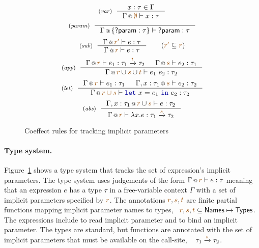 \begin{figure}[t]
\begin{equation*}
\tyrule{var}
  {x : \tau \in \Gamma}
  {\coctx{\Gamma}{\aclrd{\emptyset}} \vdash x : \tau }
\end{equation*}
\begin{equation*}
\tyrule{param}
  {}
  {\coctx{\Gamma}{ \{\ident{?param}:\tau \} } \vdash \ident{?param} : \tau }
\end{equation*}
\begin{equation*}
\tyrule{sub}
  {\coctx{\Gamma}{\aclrd{r'}} \vdash e : \tau }
  {\coctx{\Gamma}{\aclrd{r}} \vdash e : \tau }\quad\quad(\aclrd{r'} \subseteq \aclrd{r})
\end{equation*}
\begin{equation*}
\tyrule{app}
  {\coctx{\Gamma}{\aclrd{r}} \vdash e_1 : \tau_1 \xrightarrow{\aclrd{t}} \tau_2 &
   \coctx{\Gamma}{\aclrd{s}} \vdash e_2 : \tau_1 }
  {\coctx{\Gamma}{\aclrd{r} \cup \aclrd{s} \cup \aclrd{t}} \vdash e_1~e_2 : \tau_2}
\end{equation*}
\begin{equation*}
\tyrule{let}
  { \coctx{\Gamma}{\aclrd{r}} \vdash e_1 : \tau_1 &
    \coctx{\Gamma, x:\tau_1}{\aclrd{s}} \vdash e_2 : \tau_2}
  {\coctx{\Gamma}{\aclrd{r \cup s}} \vdash \kvd{let}~x=e_1~\kvd{in}~e_2 : \tau_2 }
\end{equation*}
\begin{equation*}
\tyrule{abs}
  {\coctx{\Gamma, x:\tau_1}{\aclrd{r} \cup \aclrd{s}} \vdash e : \tau_2}
  {\coctx{\Gamma}{\aclrd{r}} \vdash \lambda x.e : \tau_1 \xrightarrow{\aclrd{s}} \tau_2 }
\end{equation*}
\vspace{-0.9em}
\caption{Coeffect rules for tracking implicit parameters}
\label{fig:applications-flat-impl}
\vspace{-1em}
\end{figure}


\paragraph{Type system.}

Figure~\ref{fig:applications-flat-impl} shows a type system that tracks the set of expression's 
implicit parameters. The type system uses judgements of the form $\coctx{\Gamma}{\aclrd{r}} \vdash e : \tau$
meaning that an expression $e$ has a type $\tau$ in a free-variable context $\Gamma$ with a set 
of implicit parameters specified by $\aclrd{r}$. The annotations $\aclrd{r},\aclrd{s},\aclrd{t}$ are 
finite partial functions mapping implicit parameter names to types, \ie~$\aclrd{r},\aclrd{s},\aclrd{t} \subseteq 
\ident{Names} \mapsto \ident{Types}$. The expressions include  to read implicit
parameter and  to bind an implicit parameter. The types are standard, but functions are
annotated with the set of implicit parameters that must be available on the call-site, \ie~
$\tau_1 \xrightarrow{\aclrd{s}} \tau_2$.

